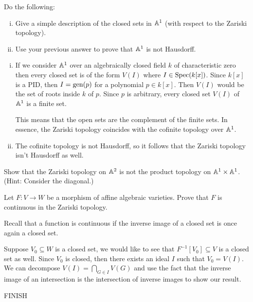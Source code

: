 \documentclass[12pt]{memoir}
\begin{document}

\begin{Ej}
  Do the following:
  \begin{enumerate}[i)]
    \item Give a simple description of the closed sets in $\mathbb{A}^1$ (with respect to the Zariski
    topology).
    \item Use your previous answer to prove that $\mathbb{A}^1$ is not Hausdorff.
  \end{enumerate}
\end{Ej}

\begin{ptcbr}
\begin{enumerate}[i)]
    \item If we consider $\mathbb{A}^1$ over an algebraically closed field $k$ of characteristic zero then every closed set is of the form $V(I)$ where $I\in\operatorname{Spec}(k[x])$. Since $k[x]$ is a PID, then $I=\operatorname{gen}(p)$ for a polynomial $p\in k[x]$. Then $V(I)$ would be the set of roots inside $k$ of $p$. Since $p$ is arbitrary, every closed set $V(I)$ of $\mathbb{A}^1$ is a finite set.\par 
    This means that the open sets are the complement of the finite sets. In essence, the Zariski topology coincides with the cofinite topology over $\mathbb{A}^1$.
    \item The cofinite topology is not Hausdorff, so it follows that the Zariski topology isn't Hausdorff as well.
\end{enumerate}
\end{ptcbr}

\begin{Ej}
  Show that the Zariski topology on $\mathbb{A}^2$ is not the product topology on $\mathbb{A}^1\times\mathbb{A}^1$. (Hint: Consider the diagonal.)
\end{Ej}

\begin{Ej}
  Let $F:V\to W$ be a morphism of affine algebraic varieties.
 Prove that $F$ is continuous in the Zariski topology. 
\end{Ej}

\begin{ptcbr}
  Recall that a function is continuous if the inverse image of a closed set is once again a closed set.\par 
  Suppose $V_0\subseteq W$ is a closed set, we would like to see that $F^{-1}[V_0]\subseteq V$ is a closed set as well. Since $V_0$ is closed, then there exists an ideal $I$ such that $V_0=V(I)$. We can decompose $V(I)=\bigcap_{G\in I}V(G)$ and use the fact that the inverse image of an intersection is the intersection of inverse images to show our result.\par 
FINISH
\end{ptcbr}
\end{document}
